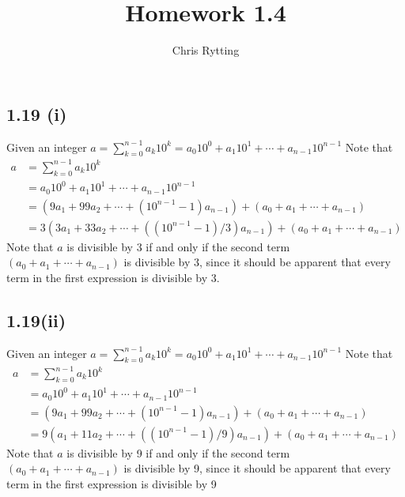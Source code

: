 \documentclass[letterpaper,12pt]{article}
\theoremstyle{definition}
\begin{document}
\title{Homework 1.4}
\author{Chris Rytting}
\maketitle

\subsection*{1.19 (i)}
Given an integer $a = \sum^{n-1}_{k = 0} a_k 10^k = a_0 10^0 +a_1 10^1 +\cdots +a_{n-1} 10^{n-1}$
Note that
\begin{align*}
    a &= \sum^{n-1}_{k = 0} a_k 10^k \\&= a_0 10^0 +a_1 10^1 +\cdots +a_{n-1}10^{n-1}
    \\&= (9a_1 +99a_2 + \cdots +(10^{n-1}-1)a_{n-1}) + (a_0 + a_1 +\cdots + a_{n-1})
    \\&= 3(3a_1 +33a_2 + \cdots +((10^{n-1}-1)/3)a_{n-1}) + (a_0 + a_1 +\cdots + a_{n-1})
\end{align*}
Note that $a$ is divisible by 3 if and only if the second term $(a_0 + a_1 +\cdots + a_{n-1})$ is divisible by 3, since it should be apparent that every term in the first expression is divisible by 3.

\subsection*{1.19(ii)}
Given an integer $a = \sum^{n-1}_{k = 0} a_k 10^k = a_0 10^0 +a_1 10^1 +\cdots +a_{n-1} 10^{n-1}$
Note that
\begin{align*}
    a &= \sum^{n-1}_{k = 0} a_k 10^k \\&= a_0 10^0 +a_1 10^1 +\cdots +a_{n-1}10^{n-1}
    \\&= (9a_1 +99a_2 + \cdots +(10^{n-1}-1)a_{n-1}) + (a_0 + a_1 +\cdots + a_{n-1})
    \\&= 9(a_1 +11a_2 + \cdots +((10^{n-1}-1)/9)a_{n-1}) + (a_0 + a_1 +\cdots + a_{n-1})
\end{align*}
Note that $a$ is divisible by 9 if and only if the second term $(a_0 + a_1 +\cdots + a_{n-1})$ is divisible by 9, since it should be apparent that every term in the first expression is divisible by 9 
\end{document}

